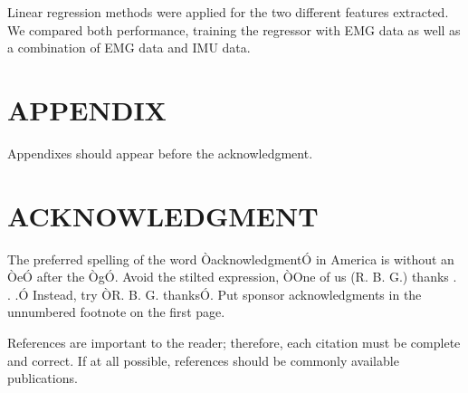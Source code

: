 \documentclass[a4paper, 10pt, conference]{ieeeconf}      %
\begin{document}
 Linear regression methods were applied for the two different features extracted. We compared both performance, training the regressor with EMG data as well as a combination of EMG data and IMU data.
	
	\addtolength{\textheight}{-12cm}   %
	
	
	
	
	
	
	
	\section*{APPENDIX}
	
	Appendixes should appear before the acknowledgment.
	
	\section*{ACKNOWLEDGMENT}
	
	The preferred spelling of the word ÒacknowledgmentÓ in America is without an ÒeÓ after the ÒgÓ. Avoid the stilted expression, ÒOne of us (R. B. G.) thanks . . .Ó  Instead, try ÒR. B. G. thanksÓ. Put sponsor acknowledgments in the unnumbered footnote on the first page.
	
	
	
	
	References are important to the reader; therefore, each citation must be complete and correct. If at all possible, references should be commonly available publications.
	
	
	
\end{document}
